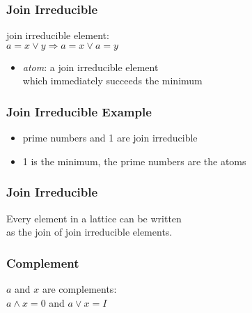 \documentclass[dvipsnames]{beamer}
\begin{document}
\begin{frame}
  \frametitle{Join Irreducible}

  \begin{definition}
    \alert{join irreducible element}:\\
    $a = x \vee y \Rightarrow a = x \vee a = y$
  \end{definition}

  \pause
  \medskip
  \begin{itemize}
    \item \emph{atom}: a join irreducible element\\
      which immediately succeeds the minimum
  \end{itemize}
\end{frame}

\begin{frame}
  \frametitle{Join Irreducible Example}

  \begin{example}
    \begin{itemize}
      \item prime numbers and 1 are join irreducible

      \pause
      \medskip
      \item 1 is the minimum, the prime numbers are the atoms
    \end{itemize}
  \end{example}
\end{frame}

\begin{frame}
  \frametitle{Join Irreducible}

  \begin{theorem}
    Every element in a lattice can be written\\
    as the join of join irreducible elements.
  \end{theorem}
\end{frame}

\begin{frame}
  \frametitle{Complement}

  \begin{definition}
    $a$ and $x$ are \alert{complements}:\\
    $a \wedge x = 0$ and $a \vee x = I$
  \end{definition}
\end{frame}
\end{document}
